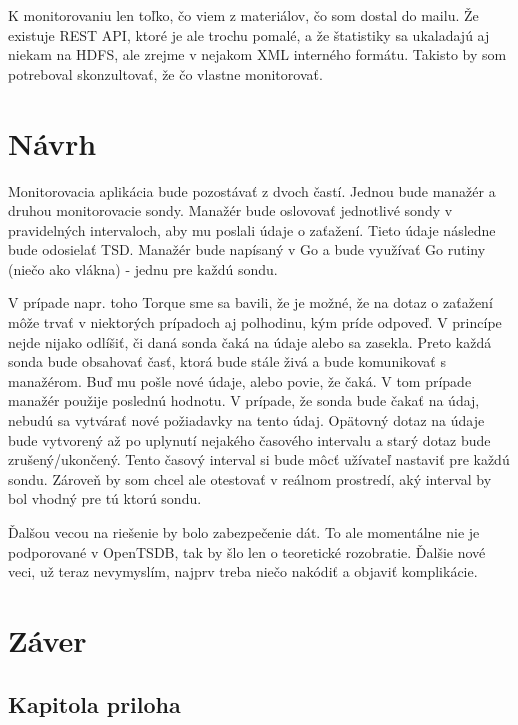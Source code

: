 \documentclass[11pt,final,oneside]{fithesis}
\begin{document}
K monitorovaniu len toľko, čo viem z materiálov, čo som dostal do mailu. Že existuje REST API, ktoré je ale trochu pomalé, a že štatistiky sa ukaladajú aj niekam na HDFS, ale zrejme v nejakom XML interného
formátu. Takisto by som potreboval skonzultovať, že čo vlastne monitorovať.

\chapter{Návrh}
Monitorovacia aplikácia bude pozostávať z dvoch častí. Jednou bude manažér a druhou monitorovacie sondy. Manažér bude oslovovať jednotlivé sondy v pravidelných intervaloch, aby mu poslali údaje o zaťažení.
Tieto údaje následne bude odosielať TSD. Manažér bude napísaný v Go a bude využívať Go rutiny (niečo ako vlákna) - jednu pre každú sondu.

V prípade napr. toho Torque sme sa bavili, že je možné, že na dotaz o zaťažení môže trvať v niektorých prípadoch aj polhodinu, kým príde odpoveď. V princípe nejde nijako odlíšiť, či daná sonda čaká na údaje
alebo sa zasekla. Preto každá sonda bude obsahovať časť, ktorá bude stále živá a bude komunikovať s manažérom. Buď mu pošle nové údaje, alebo povie, že čaká. V tom prípade manažér použije poslednú hodnotu.
V prípade, že sonda bude čakať na údaj, nebudú sa vytvárať nové požiadavky na tento údaj. Opätovný dotaz na údaje bude vytvorený až po uplynutí nejakého časového intervalu a starý dotaz bude zrušený/ukončený.
Tento časový interval si bude môcť užívateľ nastaviť pre každú sondu. Zároveň by som chcel ale otestovať v reálnom prostredí, aký interval by bol vhodný pre tú ktorú sondu.

Ďalšou vecou na riešenie by bolo zabezpečenie dát. To ale momentálne nie je podporované v OpenTSDB, tak by šlo len o teoretické rozobratie. Ďalšie nové veci, už teraz nevymyslím, najprv treba niečo nakódiť
a objaviť komplikácie.

\chapter{Záver}


\nocite{*}


\begin{appendix}
\chapter{Kapitola priloha}
\end{appendix}
\end{document}
